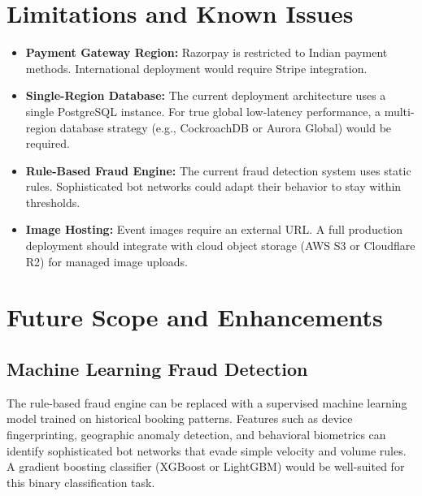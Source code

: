 \documentclass[12pt,a4paper]{report}
\begin{document}
\section{Limitations and Known Issues}
\begin{itemize}[leftmargin=2em]
    \item \textbf{Payment Gateway Region:} Razorpay is restricted to Indian payment methods. International deployment would require Stripe integration.
    \item \textbf{Single-Region Database:} The current deployment architecture uses a single PostgreSQL instance. For true global low-latency performance, a multi-region database strategy (e.g., CockroachDB or Aurora Global) would be required.
    \item \textbf{Rule-Based Fraud Engine:} The current fraud detection system uses static rules. Sophisticated bot networks could adapt their behavior to stay within thresholds.
    \item \textbf{Image Hosting:} Event images require an external URL. A full production deployment should integrate with cloud object storage (AWS S3 or Cloudflare R2) for managed image uploads.
\end{itemize}

\section{Future Scope and Enhancements}

\subsection{Machine Learning Fraud Detection}
The rule-based fraud engine can be replaced with a supervised machine learning model trained on historical booking patterns. Features such as device fingerprinting, geographic anomaly detection, and behavioral biometrics can identify sophisticated bot networks that evade simple velocity and volume rules. A gradient boosting classifier (XGBoost or LightGBM) would be well-suited for this binary classification task.
\end{document}
